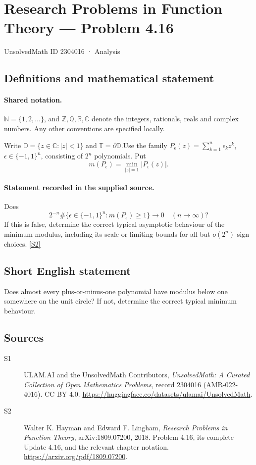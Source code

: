 \documentclass[11pt]{book}
\newcommand{\sref}[2]{\hyperlink{source:#1:#2}{[S#2]}}
\begin{document}
\setcounter{section}{2304015}
\section{Research Problems in Function Theory — Problem 4.16}\label{2304016}
{\small\sffamily UnsolvedMath ID 2304016 · Analysis}
\subsection{Definitions and mathematical statement}

\paragraph{Shared notation.}$\mathbb N=\{1,2,\ldots\}$, and $\mathbb Z,\mathbb Q,\mathbb R,\mathbb C$ denote the integers, rationals, reals and complex numbers. Any other conventions are specified locally.


Write $\mathbb D=\{z\in\mathbb C:|z|<1\}$ and $\mathbb T=\partial\mathbb D$.Use the family $P_\epsilon(z)=\sum_{k=1}^n\epsilon_kz^k$, $\epsilon\in\{-1,1\}^n$, consisting of $2^n$ polynomials. Put
\[m(P_\epsilon)=\min_{|z|=1}|P_\epsilon(z)|.
\]
\paragraph{Statement recorded in the supplied source.}
Does
\[2^{-n}\#\{\epsilon\in\{-1,1\}^n:m(P_\epsilon)\ge1\}\longrightarrow0\quad(n\to\infty)?\]
If this is false, determine the correct typical asymptotic behaviour of the minimum modulus, including its scale or limiting bounds for all but $o(2^n)$ sign choices. \sref{2304016}{2}
\subsection{Short English statement}
Does almost every plus-or-minus-one polynomial have modulus below one somewhere on the unit circle? If not, determine the correct typical minimum behaviour.
\subsection{Sources}
\begin{description}
\item[\hypertarget{source:2304016:1}{S1}] ULAM.AI and the UnsolvedMath Contributors, \emph{UnsolvedMath: A Curated Collection of Open Mathematics Problems}, record 2304016 (AMR-022-4016). CC BY 4.0. \url{https://huggingface.co/datasets/ulamai/UnsolvedMath}.
\item[\hypertarget{source:2304016:2}{S2}] Walter K. Hayman and Edward F. Lingham, \emph{Research Problems in Function Theory}, arXiv:1809.07200, 2018. Problem 4.16, its complete Update 4.16, and the relevant chapter notation. \url{https://arxiv.org/pdf/1809.07200}.
\end{description}
\label{end:2304016}
\end{document}

